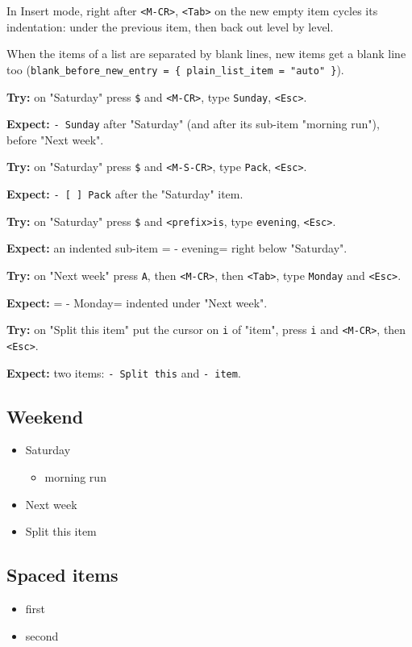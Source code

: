In Insert mode, right after \texttt{<M-CR>}, \texttt{<Tab>} on the new empty item cycles
its indentation: under the previous item, then back out level by level.

When the items of a list are separated by blank lines, new items get a
blank line too (\texttt{blank\_before\_new\_entry = \{ plain\_list\_item = "auto" \}}).

\textbf{Try:} on "Saturday" press \texttt{\$} and \texttt{<M-CR>}, type \texttt{Sunday}, \texttt{<Esc>}.

\textbf{Expect:} \texttt{- Sunday} after "Saturday" (and after its sub-item "morning
run"), before "Next week".

\textbf{Try:} on "Saturday" press \texttt{\$} and \texttt{<M-S-CR>}, type \texttt{Pack}, \texttt{<Esc>}.

\textbf{Expect:} \texttt{- [ ] Pack} after the "Saturday" item.

\textbf{Try:} on "Saturday" press \texttt{\$} and \texttt{<prefix>is}, type \texttt{evening}, \texttt{<Esc>}.

\textbf{Expect:} an indented sub-item =  - evening= right below "Saturday".

\textbf{Try:} on "Next week" press \texttt{A}, then \texttt{<M-CR>}, then \texttt{<Tab>}, type
\texttt{Monday} and \texttt{<Esc>}.

\textbf{Expect:} =  - Monday= indented under "Next week".

\textbf{Try:} on "Split this item" put the cursor on \texttt{i} of "item", press \texttt{i} and
\texttt{<M-CR>}, then \texttt{<Esc>}.

\textbf{Expect:} two items: \texttt{- Split this} and \texttt{- item}.
\subsection{Weekend}
\label{sec:orge87d85b}
\begin{itemize}
\item Saturday
\begin{itemize}
\item morning run
\end{itemize}
\item Next week
\item Split this item
\end{itemize}
\subsection{Spaced items}
\label{sec:org99371d7}
\begin{itemize}
\item first

\item second
\end{itemize}

